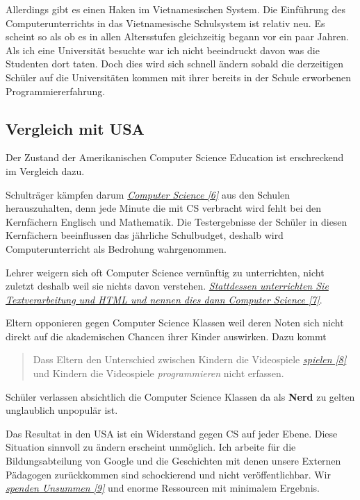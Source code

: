 \documentclass[10pt,a4paper,ngerman,twoside]{article} %
\begin{document}
\begin{multicols}{3}
Allerdings gibt es einen Haken im Vietnamesischen System. Die Einführung des Computerunterrichts in das Vietnamesische Schulsystem ist relativ neu. Es scheint so als ob es in allen Altersstufen gleichzeitig begann vor ein paar Jahren. Als ich eine Universität besuchte war ich nicht beeindruckt davon was die Studenten dort taten. Doch dies wird sich schnell ändern sobald die derzeitigen Schüler auf die Universitäten kommen mit ihrer bereits in der Schule erworbenen Programmiererfahrung.

\subsection*{Vergleich mit USA}
Der Zustand der Amerikanischen Computer Science Education ist erschreckend im Vergleich dazu.

Schulträger kämpfen darum \href{http://www.marylandpublicschools.org/MSDE/programs/esea/docs/TQ_Regulations/core_subjects.htm}{\textit{Computer Science [6]}} aus den Schulen herauszuhalten, denn jede Minute die mit CS verbracht wird fehlt bei den Kernfächern Englisch und Mathematik. Die Testergebnisse der Schüler in diesen Kernfächern beeinflussen das jährliche Schulbudget, deshalb wird Computerunterricht als Bedrohung wahrgenommen.

Lehrer weigern sich oft Computer Science vernünftig zu unterrichten, nicht zuletzt deshalb weil sie nichts davon verstehen.  \href{http://blog.carolynworks.com/?p=572}{\textit{Stattdessen unterrichten Sie Textverarbeitung und HTML und nennen dies dann Computer Science [7]}}.

Eltern opponieren gegen Computer Science Klassen weil deren Noten sich nicht direkt auf die akademischen Chancen ihrer Kinder auswirken. Dazu kommt  
\large 
\begin{quote}
\glqq 
Dass Eltern den Unterschied zwischen Kindern die Videospiele \href{http://www.youtube.com/watch?v=Lql-otlQfNo}{\textit{spielen [8]}} und Kindern die Videospiele \emph{programmieren} nicht erfassen.
\grqq
\end{quote}
\normalsize 
Schüler verlassen absichtlich die Computer Science Klassen da als \textbf{Nerd} zu gelten unglaublich unpopulär ist.

Das Resultat in den USA ist ein Widerstand gegen CS auf jeder Ebene. Diese Situation sinnvoll zu ändern erscheint unmöglich. Ich arbeite für die Bildungsabteilung von Google und die Geschichten mit denen unsere Externen Pädagogen zurückkommen sind schockierend und nicht veröffentlichbar. Wir \href{http://neil.fraser.name/news/2011/07/16/}{\textit{spenden Unsummen [9]}} und enorme Ressourcen mit minimalem Ergebnis.


\end{multicols}
\end{document}
